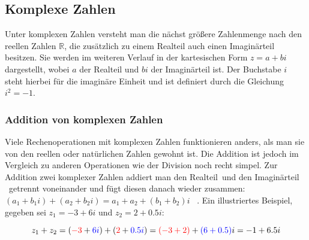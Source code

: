 \subsection{Komplexe Zahlen}\label{subsec:complex-numbers}

Unter komplexen Zahlen versteht man die nächst größere Zahlenmenge nach den reellen
Zahlen $\mathbb{R}$, die zus\"atzlich zu einem Realteil auch einen Imagin\"arteil
besitzen.
Sie werden im weiteren Verlauf in der kartesischen Form
\(z = a + bi\) dargestellt, wobei \(a\) der Realteil und \(bi\) der Imagin\"arteil ist.
Der Buchstabe \(i\) steht hierbei für die imaginäre Einheit und
ist definiert durch die Gleichung \(i^2 = -1\).

\subsubsection{Addition von komplexen Zahlen}\label{subsubsec:addition-of-complex-numbers}

Viele Rechenoperationen mit komplexen Zahlen funktionieren anders, als man sie
von den reellen oder natürlichen Zahlen gewohnt ist.
Die Addition ist jedoch im Vergleich zu anderen Operationen wie der Division
noch recht simpel.
Zur Addition zwei komplexer Zahlen addiert man den
\begingroup\color{red}Realteil\endgroup~und den
\begingroup\color{blue}Imagin\"arteil\endgroup
~getrennt voneinander und fügt diesen danach wieder zusammen:
\((a_1 + {b_1}i) + (a_2 + {b_2}i) = a_1 + a_2 + (b_1 + b_2)i\)
~\cite{lichtenegger_komplexe_2002}.
Ein illustriertes Beispiel, gegeben sei \(z_1 = -3 + 6i\) und \(z_2 = 2 + 0.5i\):

\begin{equation}\label{eq:complex-numbers-addition-example}
  z_1 + z_2
  = (\begingroup\color{red} -3\endgroup + \begingroup\color{blue} 6i\endgroup)
    + (\begingroup\color{red} 2\endgroup + \begingroup\color{blue} 0.5i\endgroup)
  = \begingroup\color{red} (-3 + 2)\endgroup + \begingroup\color{blue} (6 + 0.5)\endgroup i
  = -1 + 6.5i
\end{equation}